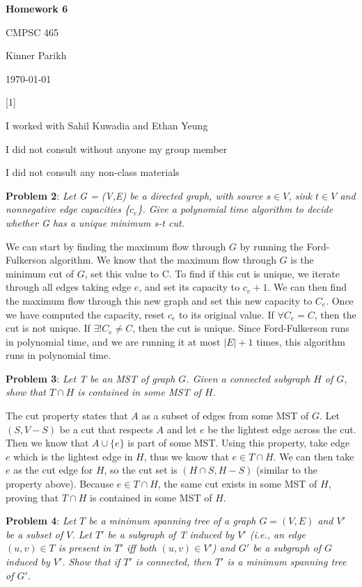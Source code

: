 \documentclass{article} %
\newcommand{\question}[2][]{\begin{flushleft}
        \textbf{Problem #1}: \textit{#2}

\end{flushleft}}
\newcommand{\maketitletwo}[2][]{\begin{center}
        \Large{\textbf{Homework #1}
            
            CMPSC 465} %
        \vspace{5pt}
        
        \normalsize{Kinner Parikh  %
        
        \today}        %
        \vspace{40pt}


        \newpage
        
\end{center}}
\begin{document}
    \maketitletwo[6]  %

    \question[1]{}
    \begin{center}
        
        I worked with Sahil Kuwadia and Ethan Yeung
    
        I did not consult without anyone my group member
    
        I did not consult any non-class materials
    \end{center}
    
    \newpage

    \question[2]{Let G = (V,E) be a directed graph, with source $s\in V$, sink $t \in V$ and nonnegative edge capacities \{$c_e$\}. Give a polynomial time algorithm to decide whether G has a unique minimum s-t cut.}

    We can start by finding the maximum flow through $G$ by running the Ford-Fulkerson algorithm. We know that the maximum flow through $G$ is the minimum cut of $G$, set this value to C. To find if this cut is unique, we iterate through all edges taking edge $e$, and set its capacity to $c_e + 1$. We can then find the maximum flow through this new graph and set this new capacity to $C_e$. Once we have computed the capacity, reset $c_e$ to its original value. If $\forall C_e = C$, then the cut is not unique. If $\exists! C_e \neq C$, then the cut is unique. Since Ford-Fulkerson runs in polynomial time, and we are running it at most $|E| + 1$ times, this algorithm runs in polynomial time.

    \newpage

    \question[3]{Let T be an MST of graph $G$. Given a connected subgraph $H$ of $G$, show that $T \cap H$ is contained in some MST of $H$.}


    The cut property states that $A$ as a subset of edges from some MST of $G$. Let $(S, V-S)$ be a cut that respects $A$ and let $e$ be the lightest edge across the cut. Then we know that $A \cup \{e\}$ is part of some MST. Using this property, take edge $e$ which is the lightest edge in $H$, thus we know that $e \in T \cap H$. We can then take $e$ as the cut edge for $H$, so the cut set is $(H \cap S, H - S)$ (similar to the property above). Because $e \in T \cap H$, the same cut exists in some MST of $H$, proving that $T \cap H$ is contained in some MST of $H$. 

    \newpage

    \question[4]{Let $T$ be a minimum spanning tree of a graph $G = (V,E)$ and $V'$ be a subset of $V$. Let $T'$ be a subgraph of T induced by $V'$ (i.e., an edge $(u,v) \in T$ is present in $T'$ iff both $(u,v) \in V'$) and $G'$ be a subgraph of $G$ induced by $V'$. Show that if $T'$ is connected, then $T'$ is a minimum spanning tree of $G'$.}

    
\end{document}

